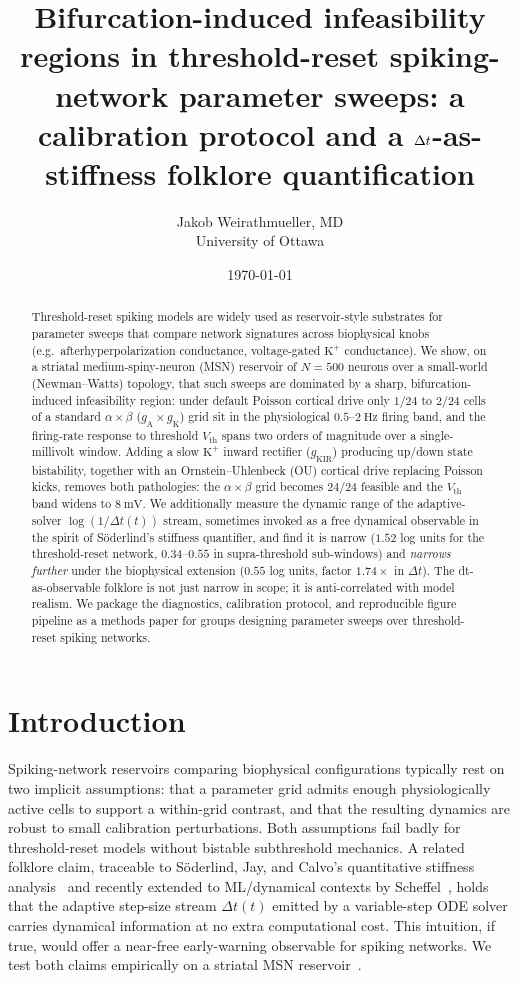 \documentclass[11pt]{article}
\title{Bifurcation-induced infeasibility regions in threshold-reset
  spiking-network parameter sweeps: a calibration protocol and a
  $\dt$-as-stiffness folklore quantification}
\author{
  Jakob Weirathmueller, MD \\
  University of Ottawa
}
\date{\today}
\newcommand{\dt}{\Delta t}
\newcommand{\Vth}{V_{\text{th}}}
\newcommand{\gA}{g_{\text{A}}}
\newcommand{\gK}{g_{\text{K}}}
\newcommand{\gKIR}{g_{\text{KIR}}}
\begin{document}
\maketitle

\begin{abstract}
Threshold-reset spiking models are widely used as reservoir-style
substrates for parameter sweeps that compare network signatures across
biophysical knobs (e.g.\ afterhyperpolarization conductance,
voltage-gated $\text{K}^+$ conductance). We show, on a striatal
medium-spiny-neuron (MSN) reservoir of $N{=}500$ neurons over a
small-world (Newman--Watts) topology, that such sweeps are dominated
by a sharp, bifurcation-induced infeasibility region: under default
Poisson cortical drive only $1/24$ to $2/24$ cells of a standard
$\alpha\times\beta$ ($\gA{}{}\times\gK{}$) grid sit in the physiological
$0.5$--$\SI{2}{\hertz}$ firing band, and the firing-rate response to
threshold $\Vth$ spans two orders of magnitude over a single-millivolt
window. Adding a slow $\text{K}^+$ inward rectifier
($\gKIR$) producing up/down state bistability, together with an
Ornstein--Uhlenbeck (OU) cortical drive replacing Poisson kicks,
removes both pathologies: the $\alpha\times\beta$ grid becomes
$24/24$ feasible and the $\Vth$ band widens to $\SI{8}{\milli\volt}$.
We additionally measure the dynamic range of the
adaptive-solver $\log(1/\dt(t))$ stream, sometimes invoked as a
free dynamical observable in the spirit of Söderlind's stiffness
quantifier, and find it is narrow ($1.52$ log units for the
threshold-reset network, $0.34$--$0.55$ in supra-threshold sub-windows)
and \emph{narrows further} under the biophysical extension
($0.55$ log units, factor $1.74\times$ in $\dt$). The dt-as-observable
folklore is not just narrow in scope; it is anti-correlated with model
realism. We package the diagnostics, calibration protocol, and
reproducible figure pipeline as a methods paper for groups designing
parameter sweeps over threshold-reset spiking networks.
\end{abstract}

\section{Introduction}
\label{sec:intro}

Spiking-network reservoirs comparing biophysical configurations
typically rest on two implicit assumptions: that a parameter grid
admits enough physiologically active cells to support a within-grid
contrast, and that the resulting dynamics are robust to small
calibration perturbations. Both assumptions fail badly for
threshold-reset models without bistable subthreshold mechanics. A
related folklore claim, traceable to
Söderlind, Jay, and Calvo's quantitative stiffness
analysis~\cite{soderlind2015} and recently extended to ML/dynamical
contexts by Scheffel~\cite{scheffel2024}, holds that the adaptive
step-size stream $\dt(t)$ emitted by a variable-step ODE solver
carries dynamical information at no extra computational cost. This
intuition, if true, would offer a near-free early-warning observable
for spiking networks. We test both claims empirically on a striatal
MSN reservoir~\cite{koos2004, wilson1996}.
\end{document}
